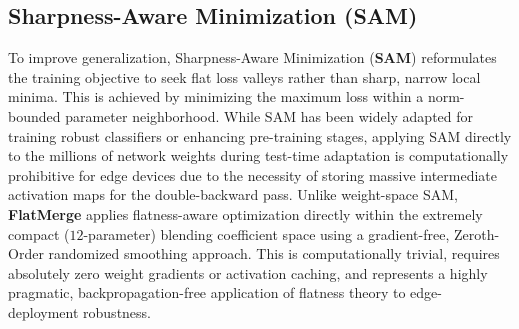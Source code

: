 \subsection{Sharpness-Aware Minimization (SAM)}
To improve generalization, Sharpness-Aware Minimization (\textbf{SAM}) \cite{sam} reformulates the training objective to seek flat loss valleys rather than sharp, narrow local minima. 
This is achieved by minimizing the maximum loss within a norm-bounded parameter neighborhood. 
While SAM has been widely adapted for training robust classifiers \cite{dinh2016density} or enhancing pre-training stages, applying SAM directly to the millions of network weights during test-time adaptation is computationally prohibitive for edge devices due to the necessity of storing massive intermediate activation maps for the double-backward pass. 
Unlike weight-space SAM, \textbf{FlatMerge} applies flatness-aware optimization directly within the extremely compact ($12$-parameter) blending coefficient space using a gradient-free, Zeroth-Order randomized smoothing approach. 
This is computationally trivial, requires absolutely zero weight gradients or activation caching, and represents a highly pragmatic, backpropagation-free application of flatness theory to edge-deployment robustness.
